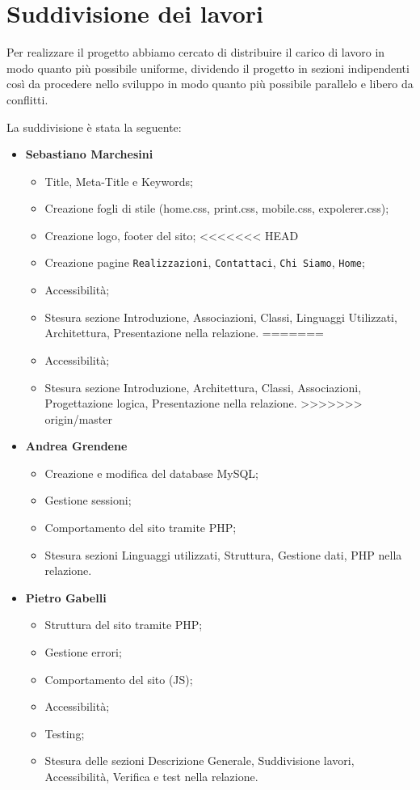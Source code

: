 \section{Suddivisione dei lavori}{
	Per realizzare il progetto abbiamo cercato di distribuire il carico di lavoro in modo quanto più possibile uniforme, dividendo il progetto in sezioni indipendenti così da procedere nello sviluppo in modo quanto più possibile parallelo e libero da conflitti.
	
	La suddivisione è stata la seguente: 	
	\begin{itemize}\itemsep1pt
		\item \textbf{Sebastiano Marchesini} 
		\begin{itemize}\itemsep1pt
			\item Title, Meta-Title e Keywords;
			\item Creazione fogli di stile (home.css, print.css, mobile.css, expolerer.css);
			\item Creazione logo, footer del sito;
<<<<<<< HEAD
			\item Creazione pagine \texttt{Realizzazioni}, \texttt{Contattaci}, \texttt{Chi Siamo}, \texttt{Home};
			\item Accessibilità;
			\item Stesura sezione Introduzione, Associazioni, Classi, Linguaggi Utilizzati, Architettura, Presentazione nella relazione.
=======
			\item Accessibilità;
			\item Stesura sezione Introduzione, Architettura, Classi, Associazioni, Progettazione logica, Presentazione nella relazione.
>>>>>>> origin/master
		\end{itemize}
		\item \textbf{Andrea Grendene}
		\begin{itemize}\itemsep1pt
			\item Creazione e modifica del database MySQL;
			\item Gestione sessioni;
			\item Comportamento del sito tramite PHP;
			\item Stesura sezioni Linguaggi utilizzati, Struttura, Gestione dati, PHP nella relazione.
		\end{itemize}
		\item \textbf{Pietro Gabelli}
		\begin{itemize}\itemsep1pt
			\item Struttura del sito tramite PHP;
			\item Gestione errori;
			\item Comportamento del sito (JS);
			\item Accessibilità;
			\item Testing;
			\item Stesura delle sezioni Descrizione Generale, Suddivisione lavori, Accessibilità, Verifica e test nella relazione.
		\end{itemize}
	\end{itemize}
}